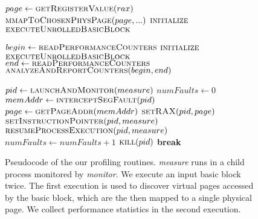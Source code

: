 \begin{figure}
\begin{algorithmic}

    \State $page \gets \Call{getRegisterValue}{rax}$
    \State $\Call{mmapToChosenPhysPage}{page, ...}$
    \State $\Call{initialize}{}$
    \State $\Call{executeUnrolledBasicBlock}{}$
    
    
    \State $begin \gets \Call{readPerformanceCounters}{}$
    \State $\Call{initialize}{}$
    \State $\Call{executeUnrolledBasicBlock}{}$
    \State $end \gets \Call{readPerformanceCounters}{}$
    \State $\Call{analyzeAndReportCounters}{begin, end}$
\EndFunction

    \State $pid \gets \Call{launchAndMonitor}{measure}$
    \State $numFaults \gets 0$
        \State $memAddr \gets \Call{interceptSegFault}{pid}$
            \State $page \gets \Call{getPageAddr}{memAddr}$
            \State $\Call{setRAX}{pid, page}$
            \State $\Call{setInstructionPointer}{pid, measure}$
            \State $\Call{resumeProcessExecution}{pid, measure}$
            \State $numFaults \gets numFaults + 1$
        \EndIf
            \State $\Call{kill}{pid}$
            \State \textbf{break}
        \EndIf
    \EndWhile
\EndFunction

\end{algorithmic}

\caption{Pseudocode of the our profiling routines. 
\textit{measure} runs in a child process monitored by
\textit{monitor}.
We execute an input basic block twice.
The first execution is used to discover virtual pages accessed
by the basic block, which are the then mapped to a single physical page.
We collect performance statistics in the second execution.}
\label{fig:code}
\end{figure}

